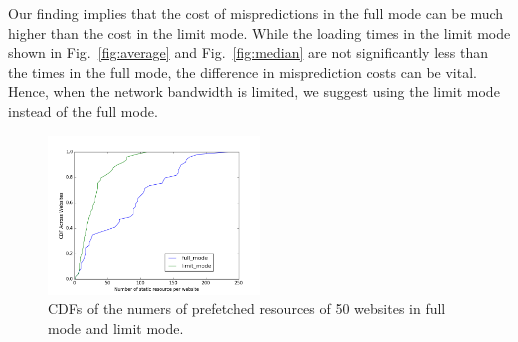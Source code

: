 Our finding implies that the cost of mispredictions in the full mode can be much higher than the cost in the limit mode. While the loading times in the limit mode shown in Fig.~\ref{fig:average} and Fig.~\ref{fig:median} are not significantly less than the times in the full mode, the difference in misprediction costs can be vital. Hence, when the network bandwidth is limited, we suggest using the limit mode instead of the full mode.


\begin{figure}[htbp] 
	\centering
	\includegraphics[width=0.5\textwidth]{static_resource.png}  
	\caption{CDFs of the numers of prefetched resources of 50 websites in full mode and limit mode.}
	\label{fig:number_requests}
\end{figure} 











